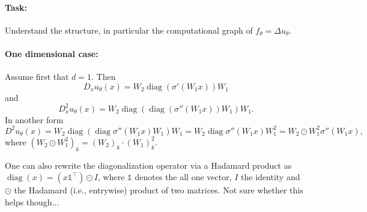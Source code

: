 \documentclass[11pt]{article}
\theoremstyle{definition}
\theoremstyle{plain}
\begin{document}
\paragraph{Task: }
Understand the structure, in particular the computational graph of $f_\theta = \Delta u_\theta$. 

\paragraph{One dimensional case: }
Assume first that $d=1$. 
Then
\[ D_x u_\theta(x) = W_2 \operatorname{diag}(\sigma'(W_1 x)) W_1 \]
and 
\[ D^2_x u_\theta(x) = W_2%
\operatorname{diag}(\operatorname{diag}(\sigma''(W_1 x)) W_1)W_1. %
\]
In another form
\[D^2 u_\theta(x) = W_2 \operatorname{diag}(\operatorname{diag}\sigma''(W_1 x) W_1) W_1 = W_2 \operatorname{diag}\sigma''(W_1 x) W_1^2 = W_2\odot W_1^2 \sigma''(W_1x), 
\]
where $(W_2\odot W_1^2)_k = (W_2)_k \cdot (W_1)_k^2$. 

One can also rewrite the diagonalization operator via a Hadamard product as $\operatorname{diag}(x) = (x\mathds{1}^\top)\odot I$, where $\mathds{1}$ denotes the all one vector, $I$ the identity and $\odot$ the Hadamard (i.e., entrywise) product of two matrices. Not sure whether this helps though...

\end{document}
